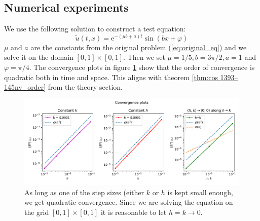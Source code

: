 \subsection{Numerical experiments}
We use the following solution to construct a test equation:
\begin{equation}
  \tilde{u}(t, x) = \text{e}^{-(\mu b + a)t} \sin (bx + \varphi)
\end{equation}
\( \mu  \) and \( a \) are the constants from the original problem
(\eqref{eq:original_eq}) and we solve it on the domain \( [0,1] \times [0,1] \).
Then we set \( \mu = 1/5, b = 3\pi/2, a = 1 \) and \( \varphi = \pi/4 \).
The convergence plots in figure \ref{fig:conv_plot}
show that the order of convergence is quadratic both in
time and space.
This aligns with theorem \ref{thm:cos 1393–145nv_order}
from the theory section.
\begin{figure}[!h]
    \centering
    \includegraphics[width=\textwidth]{Images/plots/task1_error.pdf}
    \caption{As long as one of the step sizes (either \( k\) or \( h \)
      is kept small enough, we get quadratic convergence.
      Since we are solving the equation on the grid 
      \( [0,1] \times [0,1] \) it is reasonable to let
      \( h=k \to 0 \).
    }
    \label{fig:conv_plot}
\end{figure}
